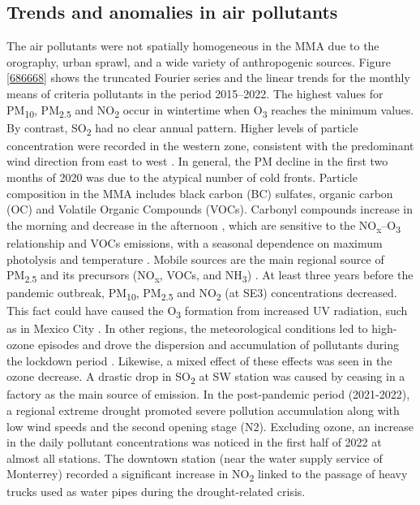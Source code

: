 \documentclass[sn-mathphys-num]{sn-jnl}
\begin{document}
\subsection{Trends and anomalies in air pollutants}
The air pollutants were not spatially homogeneous in the MMA due to the orography, urban sprawl, and a wide variety of anthropogenic sources. Figure \ref{686668} shows the truncated Fourier series and the linear trends for the monthly means of criteria pollutants in the period 2015–2022. The highest values for PM\textsubscript{10}, PM\textsubscript{2.5} and NO\textsubscript{2} occur in wintertime when O\textsubscript{3} reaches the minimum values. By contrast, SO\textsubscript{2} had no clear annual pattern. Higher levels of particle concentration were recorded in the western zone, consistent with the predominant wind direction from east to west \citep{Gonz_lez_Santiago_2011}. In general, the PM decline in the first two months of 2020 was due to the atypical number of cold fronts. Particle composition in the MMA includes black carbon (BC) \citep{Peralta_2019} sulfates, organic carbon (OC) \citep{Mancilla_2019} and Volatile Organic Compounds (VOCs). Carbonyl compounds increase in the morning and decrease in the afternoon \citep{j2012}, which are sensitive to the NO\textsubscript{x}--O\textsubscript{3} relationship and VOCs emissions, with a seasonal dependence on maximum photolysis and temperature \citep{Menchaca_Torre_2015,Menchaca_Torre_2015a, Hern_ndez_Paniagua_2017}. Mobile sources are the main regional source of PM\textsubscript{2.5} and its precursors (NO\textsubscript{x}, VOCs, and NH\textsubscript{3}) \citep{Martinez-Cinco2016}. At least three years before the pandemic outbreak, PM\textsubscript{10}, PM\textsubscript{2.5} and NO\textsubscript{2} (at SE3) concentrations decreased. This fact could have caused the O\textsubscript{3} formation from increased UV radiation, such as in Mexico City \citep{Ipi_a_2021}. In other regions, the meteorological conditions led to high-ozone episodes and drove the dispersion and accumulation of pollutants during the lockdown period \citep{Tello_Leal_2021,Bera_2022,SULAYMON}. Likewise, a mixed effect of these effects was seen in the ozone decrease. A drastic drop in SO\textsubscript{2} at SW station was caused by ceasing in a factory as the main source of emission. In the post-pandemic period (2021-2022), a regional extreme drought promoted severe pollution accumulation along with low wind speeds and the second opening stage (N2). Excluding ozone, an increase in the daily pollutant concentrations was noticed in the first half of 2022 at almost all stations. The downtown station (near the water supply service of Monterrey) recorded a significant increase in NO\textsubscript{2} linked to the passage of heavy trucks used as water pipes during the drought-related crisis.
\end{document}
